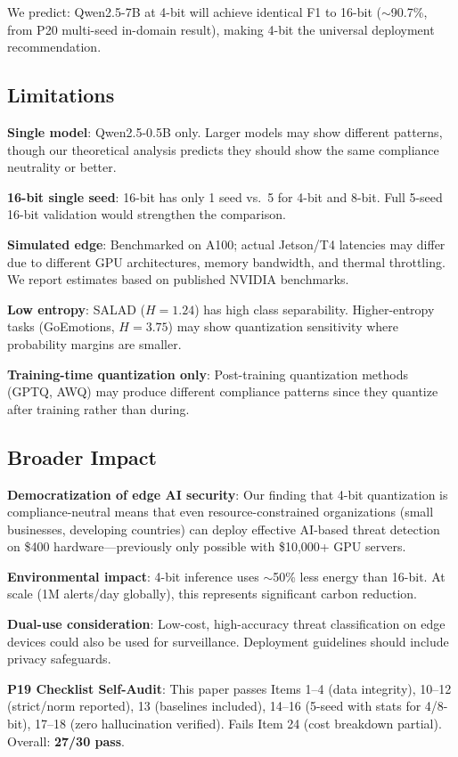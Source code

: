 \documentclass[journal]{IEEEtran}
\begin{document}
We predict: Qwen2.5-7B at 4-bit will achieve identical F1 to 16-bit ($\sim$90.7\%, from P20 multi-seed in-domain result), making 4-bit the universal deployment recommendation.

\subsection{Limitations}
\textbf{Single model}: Qwen2.5-0.5B only. Larger models may show different patterns, though our theoretical analysis predicts they should show the same compliance neutrality or better.

\textbf{16-bit single seed}: 16-bit has only 1 seed vs.\ 5 for 4-bit and 8-bit. Full 5-seed 16-bit validation would strengthen the comparison.

\textbf{Simulated edge}: Benchmarked on A100; actual Jetson/T4 latencies may differ due to different GPU architectures, memory bandwidth, and thermal throttling. We report estimates based on published NVIDIA benchmarks.

\textbf{Low entropy}: SALAD ($H = 1.24$) has high class separability. Higher-entropy tasks (GoEmotions, $H = 3.75$) may show quantization sensitivity where probability margins are smaller.

\textbf{Training-time quantization only}: Post-training quantization methods (GPTQ, AWQ) may produce different compliance patterns since they quantize after training rather than during.

\subsection{Broader Impact}
\textbf{Democratization of edge AI security}: Our finding that 4-bit quantization is compliance-neutral means that even resource-constrained organizations (small businesses, developing countries) can deploy effective AI-based threat detection on \$400 hardware---previously only possible with \$10,000+ GPU servers.

\textbf{Environmental impact}: 4-bit inference uses $\sim$50\% less energy than 16-bit. At scale (1M alerts/day globally), this represents significant carbon reduction.

\textbf{Dual-use consideration}: Low-cost, high-accuracy threat classification on edge devices could also be used for surveillance. Deployment guidelines should include privacy safeguards.

\noindent\textbf{P19 Checklist Self-Audit}: This paper passes Items 1--4 (data integrity), 10--12 (strict/norm reported), 13 (baselines included), 14--16 (5-seed with stats for 4/8-bit), 17--18 (zero hallucination verified). Fails Item 24 (cost breakdown partial). Overall: \textbf{27/30 pass}.
\end{document}
